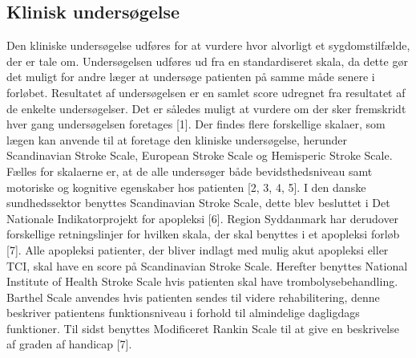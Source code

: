 \subsection{Klinisk undersøgelse}
Den kliniske undersøgelse udføres for at vurdere hvor alvorligt et sygdomstilfælde, der er tale om. Undersøgelsen udføres ud fra en standardiseret skala, da dette gør det muligt for andre læger at undersøge patienten på samme måde senere i forløbet. Resultatet af undersøgelsen er en samlet score udregnet fra resultatet af de enkelte undersøgelser. Det er således muligt at vurdere om der sker fremskridt hver gang undersøgelsen foretages [1]. 
Der findes flere forskellige skalaer, som lægen kan anvende til at foretage den kliniske undersøgelse, herunder Scandinavian Stroke Scale, European Stroke Scale og Hemisperic Stroke Scale. Fælles for skalaerne er, at de alle undersøger både bevidsthedsniveau samt motoriske og kognitive egenskaber hos patienten [2, 3, 4, 5]. I den danske sundhedssektor benyttes Scandinavian Stroke Scale, dette blev besluttet i Det Nationale Indikatorprojekt for apopleksi [6]. Region Syddanmark har derudover forskellige retningslinjer for hvilken skala, der skal benyttes i et apopleksi forløb [7]. Alle apopleksi patienter, der bliver indlagt med mulig akut apopleksi eller TCI, skal have en score på Scandinavian Stroke Scale. Herefter benyttes National Institute of Health Stroke Scale hvis patienten skal have trombolysebehandling. Barthel Scale anvendes hvis patienten sendes til videre rehabilitering, denne beskriver patientens funktionsniveau i forhold til almindelige dagligdags funktioner. Til sidst benyttes Modificeret Rankin Scale til at give en beskrivelse af graden af handicap [7]. 

